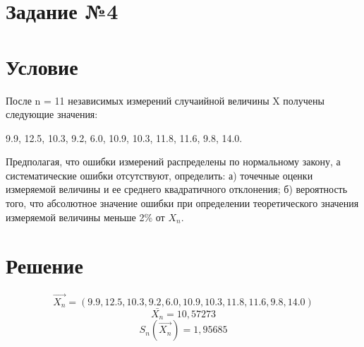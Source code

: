 \section{Задание №4}
\section*{Условие} 
После n = 11 независимых измерений случаийной величины X получены следующие значения: 

\begin{center}
9.9, 12.5, 10.3, 9.2, 6.0, 10.9, 10.3, 11.8, 11.6, 9.8, 14.0. 
\end{center}

\noindent Предполагая, что ошибки измерений распределены по нормальному закону, а систематические ошибки отсутствуют, определить: 
а) точечные оценки измеряемой величины и ее среднего квадратичного отклонения; 
б) вероятность того, что абсолютное значение ошибки при определении теоретического значения измеряемой величины меньше 2\% от \({X_n}\).
\section*{Решение} 

\begin{equation*} 
	\vec{X_n} = (9.9, 12.5, 10.3, 9.2, 6.0, 10.9, 10.3, 11.8, 11.6, 9.8, 14.0)
\end{equation*}
\begin{equation*} 
	\bar{X_n} = 10,57273
\end{equation*}
\begin{equation*} 
	S_n(\vec{X_n}) = 1,95685
\end{equation*}

